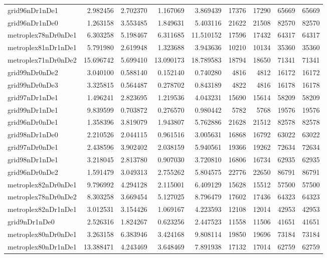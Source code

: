 \begin{longtable}{|l|r|r|r|r|r|r|r|r|}
grid96nDr1nDe1 & 2.982456 & 2.702370 & 1.167069 & 3.869439 & 17376 & 17290 & 65669 & 65669 \\
grid96nDr1nDe0 & 1.263158 & 3.553485 & 1.849631 & 5.403116 & 21622 & 21508 & 82570 & 82570 \\
metroplex78nDr0nDe1 & 6.303258 & 5.198467 & 6.311685 & 11.510152 & 17596 & 17432 & 64317 & 64317 \\
metroplex81nDr1nDe1 & 5.791980 & 2.619948 & 1.323688 & 3.943636 & 10210 & 10134 & 35360 & 35360 \\
metroplex71nDr0nDe2 & 15.696742 & 5.699410 & 13.090173 & 18.789583 & 18794 & 18650 & 71341 & 71341 \\
grid99nDr0nDe2 & 3.040100 & 0.588140 & 0.152140 & 0.740280 & 4816 & 4812 & 16172 & 16172 \\
grid99nDr0nDe3 & 3.325815 & 0.564487 & 0.278702 & 0.843189 & 4822 & 4816 & 16178 & 16178 \\
grid97nDr1nDe1 & 1.496241 & 2.823695 & 1.219536 & 4.043231 & 15690 & 15614 & 58209 & 58209 \\
grid99nDr1nDe1 & 9.839599 & 0.703872 & 0.276570 & 0.980442 & 5782 & 5768 & 19576 & 19576 \\
grid96nDr0nDe1 & 1.358396 & 3.819079 & 1.943807 & 5.762886 & 21628 & 21512 & 82578 & 82578 \\
grid98nDr1nDe0 & 2.210526 & 2.044115 & 0.961516 & 3.005631 & 16868 & 16792 & 63022 & 63022 \\
grid97nDr0nDe1 & 2.438596 & 3.902402 & 2.038159 & 5.940561 & 19366 & 19262 & 72634 & 72634 \\
grid98nDr1nDe1 & 3.218045 & 2.813780 & 0.907030 & 3.720810 & 16806 & 16734 & 62935 & 62935 \\
grid96nDr0nDe2 & 1.591479 & 3.049313 & 2.755262 & 5.804575 & 22776 & 22650 & 86791 & 86791 \\
metroplex82nDr0nDe1 & 9.796992 & 4.294128 & 2.115001 & 6.409129 & 15628 & 15512 & 57500 & 57500 \\
metroplex78nDr0nDe2 & 8.303258 & 3.669454 & 5.127025 & 8.796479 & 17602 & 17436 & 64323 & 64323 \\
metroplex82nDr1nDe1 & 3.012531 & 3.154426 & 1.069167 & 4.223593 & 12108 & 12014 & 42953 & 42953 \\
grid9nDr1nDe0 & 2.526316 & 1.824267 & 0.623256 & 2.447523 & 11558 & 11506 & 41651 & 41651 \\
metroplex80nDr0nDe1 & 3.263158 & 6.383946 & 3.424168 & 9.808114 & 19850 & 19696 & 73184 & 73184 \\
metroplex80nDr1nDe1 & 13.388471 & 4.243469 & 3.648469 & 7.891938 & 17132 & 17014 & 62759 & 62759 \\

\end{longtable}
